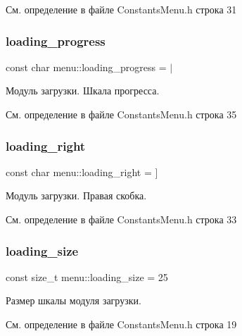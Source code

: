 См. определение в файле Constants\+Menu.\+h строка 31

\mbox{\label{namespacemenu_ab79f369195d81dcb241b1ab5269c9d3d}} 
\subsubsection{\texorpdfstring{loading\+\_\+progress}{loading\_progress}}
{\footnotesize\ttfamily const char menu\+::loading\+\_\+progress = \textquotesingle{}$\vert$\textquotesingle{}}

Модуль загрузки. Шкала прогресса. 

См. определение в файле Constants\+Menu.\+h строка 35

\mbox{\label{namespacemenu_a272b2c0c591457b2aeccaae0c122a1fc}} 
\subsubsection{\texorpdfstring{loading\+\_\+right}{loading\_right}}
{\footnotesize\ttfamily const char menu\+::loading\+\_\+right = \textquotesingle{}\mbox{]}\textquotesingle{}}

Модуль загрузки. Правая скобка. 

См. определение в файле Constants\+Menu.\+h строка 33

\mbox{\label{namespacemenu_aa3bc0d7f62e04dc52dd8f276902448ae}} 
\subsubsection{\texorpdfstring{loading\+\_\+size}{loading\_size}}
{\footnotesize\ttfamily const size\+\_\+t menu\+::loading\+\_\+size = 25}

Размер шкалы модуля загрузки. 

См. определение в файле Constants\+Menu.\+h строка 19

